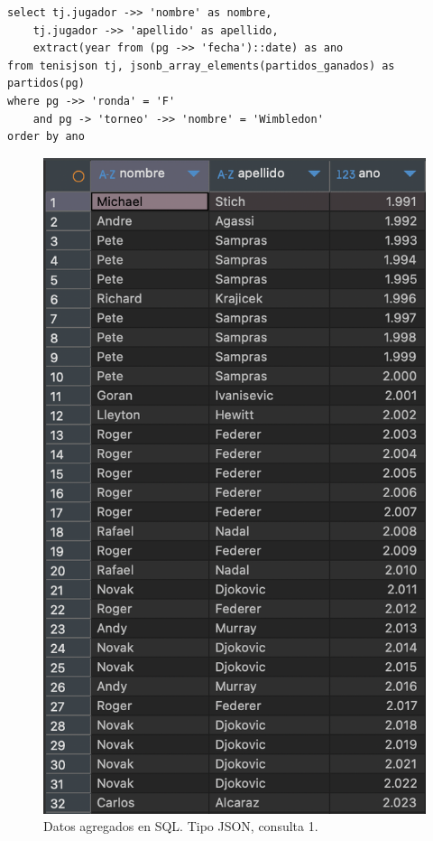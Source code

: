 \begin{verbatim}
select tj.jugador ->> 'nombre' as nombre, 
    tj.jugador ->> 'apellido' as apellido, 
    extract(year from (pg ->> 'fecha')::date) as ano
from tenisjson tj, jsonb_array_elements(partidos_ganados) as partidos(pg)
where pg ->> 'ronda' = 'F' 
    and pg -> 'torneo' ->> 'nombre' = 'Wimbledon'
order by ano
\end{verbatim}

\begin{figure}[H]
\centering
\includegraphics[height=0.4\textheight]{fotos/q1_json.png}
\caption{Datos agregados en SQL. Tipo JSON, consulta 1.}
\label{fig:q1_json}
\end{figure}



